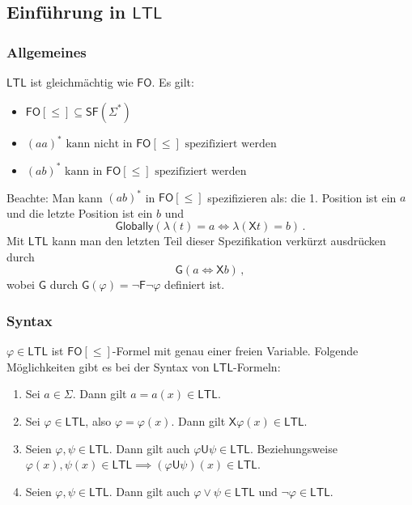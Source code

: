 \documentclass[12pt, german]{article}
\newcommand{\sigstern}{\Sigma^\ast}
\newcommand{\starfree}{\mathsf{SF}}
\newcommand{\fo}{\mathsf{FO}}
\newcommand{\ltl}{\mathsf{LTL}}
\newcommand{\sX}{\mathsf{X}}
\newcommand{\sF}{\mathsf{F}}
\newcommand{\sG}{\mathsf{G}}
\newcommand{\sU}{\mathsf{U}}
\begin{document}
\subsection{Einführung in $\ltl$}
\subsubsection{Allgemeines}
	$\ltl$ ist gleichmächtig wie $\fo$.
	Es gilt: 
	\begin{itemize}
		\item $\fo[\leq] \subseteq \starfree(\sigstern) $
		 \item $(aa)^\ast \text{ kann nicht in } \fo[\leq] \text{ spezifiziert werden} $
		\item $(ab)^\ast \text{ kann in } \fo[\leq] \text{ spezifiziert werden} $
	\end{itemize}

	
	Beachte: Man kann $(ab)^\ast$ in $\fo[\leq]$ spezifizieren als: die 1. Position ist ein $a$ und die letzte Position ist ein $b$ und $$\mathsf{Globally}(\lambda(t) = a \iff \lambda(\sX t) = b)\, .$$
	Mit $\ltl$ kann man den letzten Teil dieser Spezifikation verkürzt ausdrücken durch $$\sG(a \iff \sX b)\, ,$$ wobei $\sG$ durch $\sG(\varphi) = \neg \sF \neg \varphi$ definiert ist.

\subsubsection{Syntax}
	$\varphi \in \ltl$ ist $\fo[\leq]$-Formel mit genau einer freien Variable.
	Folgende Möglichkeiten gibt es bei der Syntax von $\ltl$-Formeln:
		\begin{enumerate}[label=\arabic*.)]
			\item Sei $a \in \Sigma$. Dann gilt $a = a(x) \in \ltl$.
			\item Sei $\varphi \in \ltl$, also $\varphi = \varphi(x)$. Dann gilt $\sX \varphi(x) \in \ltl$.
			\item Seien $\varphi, \psi \in \ltl$. Dann gilt auch $\varphi \sU \psi \in \ltl$. Beziehungsweise $\varphi(x), \psi(x) \in \ltl \implies (\varphi \sU \psi )(x)\in \ltl$.
			\item Seien $\varphi, \psi \in \ltl$. Dann gilt auch $\varphi \lor \psi \in \ltl$ und $\neg \varphi \in \ltl$.
		\end{enumerate}
	
\end{document}

